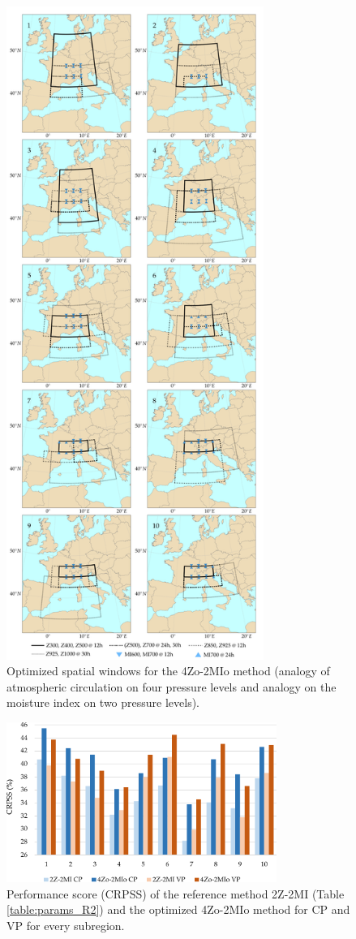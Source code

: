 \documentclass[review]{elsarticle}
\begin{document}
\begin{figure}[t]
	\centerline{\includegraphics[width=8.4cm]{figures/fig06.pdf}}
	\caption{Optimized spatial windows for the 4Zo-2MIo method (analogy of atmospheric circulation on four pressure levels and analogy on the moisture index on two pressure levels).}
	\label{fig:spatial_windows_4Zo-2MIo}
\end{figure}

\begin{figure}[t]
	\centerline{\includegraphics[width=8.8cm]{figures/fig07.pdf}}
	\caption{Performance score (CRPSS) of the reference method 2Z-2MI (Table \ref{table:params_R2}) and the optimized 4Zo-2MIo method for CP and VP for every subregion.}
	\label{fig:figure_crpss_4Zo-2HIo}
\end{figure}
\end{document}
